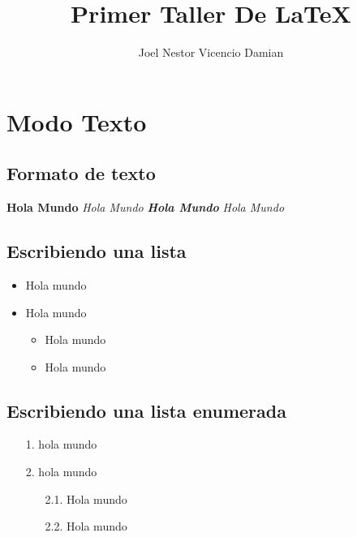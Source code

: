 \documentclass{article}
\title{Primer Taller De LaTeX}
\author{Joel Nestor Vicencio Damian}
\date{}
\begin{document}
    \maketitle
    
    \tableofcontents

\section{Modo Texto}
        \subsection{Formato de texto}
            \textbf{Hola Mundo} \textit{Hola Mundo} \textbf{\textit{Hola Mundo}} \emph{Hola Mundo}
        
        \subsection{Escribiendo una lista}
            \begin{itemize}
                \item Hola mundo
                \item Hola mundo
                    \begin{itemize}
                        \item Hola mundo
                        \item Hola mundo
                    \end{itemize}
            \end{itemize}
         
        \subsection{Escribiendo una lista enumerada}   
            \begin{enumerate}
                \item [1.] hola mundo
                \item [2.] hola mundo
                    \begin{enumerate}
                        \item [2.1.] Hola mundo
                        \item [2.2.] Hola mundo
                    \end{enumerate}
            \end{enumerate}
        
\end{document}
